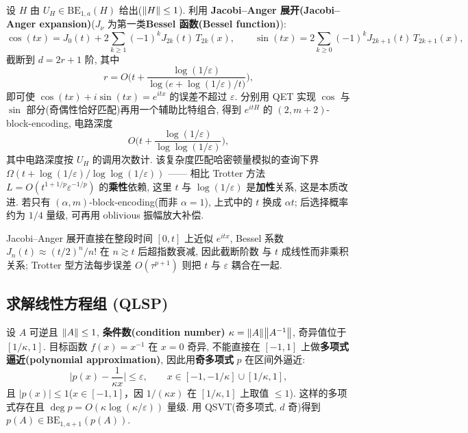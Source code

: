 \documentclass[utf8]{article} %
\numberwithin{equation}{section}   %
\newtheorem{Thm}{\hskip 2em {\color{blue} 定理}}[subsection]
\newtheorem{Note}{\hskip 2em {\color{red} 注}}[subsection]
\begin{document}
\begin{Thm}
    设 $H$ 由 $U_H \in \mathrm{BE}_{1,a}(H)$ 给出($\norm{H} \le 1$). 利用
    \textbf{Jacobi--Anger 展开(Jacobi--Anger expansion)}($J_\nu$ 为第一类\textbf{Bessel 函数(Bessel function)}):
    \begin{equation}
        \cos(tx) = J_0(t) + 2\sum_{k\ge 1}(-1)^k J_{2k}(t)\, T_{2k}(x), \qquad
        \sin(tx) = 2\sum_{k\ge 0}(-1)^k J_{2k+1}(t)\, T_{2k+1}(x),
    \end{equation}
    截断到 $d = 2r + 1$ 阶, 其中
    \begin{equation}
        r = O\!\Big(t + \frac{\log(1/\varepsilon)}{\log\big(e + \log(1/\varepsilon)/t\big)}\Big),
    \end{equation}
    即可使 $\cos(tx) + i\sin(tx) = e^{itx}$ 的误差不超过 $\varepsilon$.
    分别用 QET 实现 $\cos$ 与 $\sin$ 部分(奇偶性恰好匹配)再用一个辅助比特组合,
    得到 $e^{itH}$ 的 $(2, m+2)$-block-encoding, 电路深度
    \begin{equation}
        O\!\Big(t + \frac{\log(1/\varepsilon)}{\log\log(1/\varepsilon)}\Big),
    \end{equation}
    其中电路深度按 $U_H$ 的调用次数计. 该复杂度匹配哈密顿量模拟的查询下界
    $\Omega(t + \log(1/\varepsilon)/\log\log(1/\varepsilon))$ —— 相比 Trotter 方法
    $L = O(t^{1+1/p}\varepsilon^{-1/p})$ 的\textbf{乘性}依赖, 这里 $t$ 与
    $\log(1/\varepsilon)$ 是\textbf{加性}关系, 这是本质改进.
    若只有 $(\alpha,m)$-block-encoding(而非 $\alpha = 1$), 上式中的 $t$ 换成 $\alpha t$;
    后选择概率约为 $1/4$ 量级, 可再用 oblivious 振幅放大补偿.
\end{Thm}

\begin{Note}[为什么能避免时间分段]
    Jacobi--Anger 展开直接在整段时间 $[0,t]$ 上近似 $e^{itx}$, Bessel 系数
    $J_n(t) \approx (t/2)^n/n!$ 在 $n \gtrsim t$ 后超指数衰减, 因此截断阶数
    与 $t$ 成线性而非乘积关系; Trotter 型方法每步误差 $O(\tau^{p+1})$ 则把 $t$
    与 $\varepsilon$ 耦合在一起.
\end{Note}

\subsection{求解线性方程组 (QLSP)}

设 $A$ 可逆且 $\norm{A} \le 1$, \textbf{条件数(condition number)} $\kappa = \norm{A}\norm{A^{-1}}$,
奇异值位于 $[1/\kappa, 1]$. 目标函数 $f(x) = x^{-1}$ 在 $x = 0$ 奇异, 不能直接在
$[-1,1]$ 上做\textbf{多项式逼近(polynomial approximation)}, 因此用\textbf{奇多项式} $p$ 在区间外逼近:
\begin{equation}
    \Big|p(x) - \frac{1}{\kappa x}\Big| \le \varepsilon, \qquad x \in [-1, -1/\kappa] \cup [1/\kappa, 1],
\end{equation}
且 $|p(x)| \le 1$($x \in [-1,1]$，因 $1/(\kappa x)$ 在 $[1/\kappa,1]$ 上取值 $\le 1$). 这样的多项式存在且
$\deg p = O(\kappa \log(\kappa/\varepsilon))$ 量级. 用 QSVT(奇多项式, $d$ 奇)得到
$p(A) \in \mathrm{BE}_{1,a+1}(p(A))$.
\end{document}
